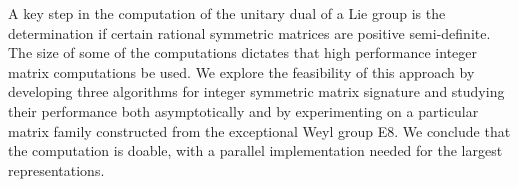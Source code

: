 A key step in the computation of the unitary dual of a Lie group is
the determination if certain rational symmetric matrices are positive
semi-definite. The size of some of the computations dictates that high
performance integer matrix computations be used.  We explore the
feasibility of this approach by developing three algorithms for
integer symmetric matrix signature and studying their performance both
asymptotically and by experimenting on a particular matrix family
constructed from the exceptional Weyl group E8.  We conclude that the
computation is doable, with a parallel implementation needed for the
largest representations.

